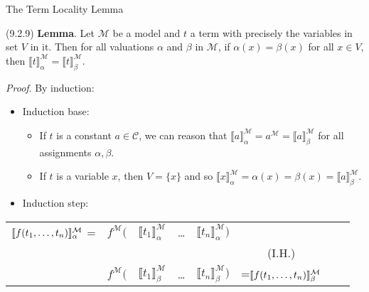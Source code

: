 \begin{frame}{The Term Locality Lemma}

 (9.2.9) \textbf{Lemma}. Let $\mathcal{M}$ be a model and $t$ a term with precisely the variables in set $V$ in it. Then for all valuations $\alpha$ and $\beta$ in $\mathcal{M}$, if $\alpha(x)=\beta(x)$ for all $x\in V$, then $\llbracket t\rrbracket_\alpha^\mathcal{M}=\llbracket t\rrbracket_\beta^\mathcal{M}$.
		
\vspace{2ex}	
		
\emph{Proof}. By induction:

\begin{itemize}

	\item Induction base:
	
	\begin{itemize}
	
	\item If $t$ is a constant $a\in\mathcal{C}$, we can reason that $\llbracket a\rrbracket^\mathcal{M}_\alpha=a^\mathcal{M}=\llbracket a\rrbracket^\mathcal{M}_\beta$ for all assignments $\alpha,\beta$. 
	
	\item If $t$ is a variable $x$, then $V=\{x\}$ and so $\llbracket x\rrbracket^\mathcal{M}_\alpha=\alpha(x)=\beta(x)=\llbracket a\rrbracket^\mathcal{M}_\beta$. 
	
	\end{itemize}
	
	\item Induction step:

\vspace{-2ex}	
	\end{itemize}

	{\small
	\begin{center}
		\begin{tabular}{c c c c c c ll}
		$\llbracket f(t_1, \mathellipsis, t_n)\rrbracket^\mathcal{M}_\alpha$ = & $f^\mathcal{M}($ & $\llbracket t_1\rrbracket^\mathcal{M}_\alpha$ &  \dots & $\llbracket t_n\rrbracket^\mathcal{M}_\alpha)$\\
		 & & \rotatebox{90}{=} & & \rotatebox{90}{=} &(I.H.)\\
		& $f^\mathcal{M}($ & $\llbracket t_1\rrbracket^\mathcal{M}_\beta$ &  \dots & $\llbracket t_n\rrbracket^\mathcal{M}_\beta)$&=$\llbracket f(t_1, \mathellipsis, t_n)\rrbracket^\mathcal{M}_\beta$ \\
		\end{tabular}
		\end{center}}


\end{frame}

